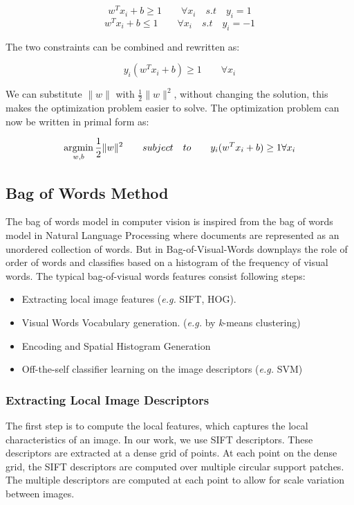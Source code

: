 \begin{equation}
{w^T}x_i + b \geq 1 \qquad \forall x_i \quad s.t \quad y_i = 1
\end{equation}
\begin{equation}
{w^T}x_i + b \leq 1 \qquad \forall x_i \quad s.t \quad y_i = -1
\end{equation}

The two constraints can be combined and rewritten as:

\begin{equation}
y_i(w^{T}x_i + b) \geq 1 \qquad \forall x_i
\end{equation}

We can substitute $\|w\|$ with $\frac{1}{2}\|w\|^2$, without changing the solution, this makes the optimization problem easier to solve. The optimization problem can now be written in primal form as:

\begin{equation}
\begin{split}
\operatornamewithlimits{argmin}_{w, b}\frac{1}{2} \|w\|^2
\qquad subject\quad to \qquad y_i(w^{T}x_i + b) \geq 1 \forall x_i
\end{split}
\end{equation}

\subsection{Bag of Words Method}
The bag of words model in computer vision is inspired from the bag of words model in Natural Language Processing where documents are represented as an unordered collection of words. But in Bag-of-Visual-Words downplays the role of order of words and classifies based on a histogram of the frequency of visual words. The typical bag-of-visual words features consist following steps:
\begin{itemize}
\item Extracting local image features (\textit{e.g.} \textsc{SIFT}, \textsc{HOG}).
\item Visual Words Vocabulary generation. (\textit{e.g.} by \textit{k}-means clustering)
\item Encoding and Spatial Histogram Generation
\item Off-the-self classifier learning on the image descriptors (\textit{e.g.} \textsc{SVM})
\end{itemize}

\subsubsection{Extracting Local Image Descriptors}
The first step is to compute the local features, which captures the local characteristics of an image. In our work, we use \textsc{SIFT} descriptors. These descriptors are extracted at a dense  grid of points. At each point on the dense grid, the \textsc{SIFT} descriptors are computed over multiple circular support patches. The multiple descriptors  are computed at each point to allow for scale variation between images.

